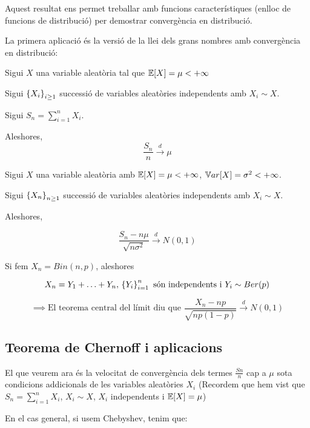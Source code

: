 Aquest resultat ens permet treballar amb funcions característiques (enlloc de funcions de distribució) per
demostrar convergència en distribució.

La primera aplicació és la versió de la llei dels grans nombres amb convergència en distribució:

\begin{thm}
  Sigui $X$ una variable aleatòria tal que $\mathbb{E}[X] = \mu < +\infty$
  
  Sigui $\left\{X_i\right\}_{i\geq1}$ successió de variables aleatòries independents amb $X_i \sim X$.
  
  Sigui $S_n = \sum\limits_{i=1}^n X_i$.
  
  Aleshores,
  \[
    \frac{S_n}{n} \overset{d}{\to} \mu
  \]
\end{thm}

\begin{thm}
  Sigui $X$ una variable aleatòria amb $\mathbb{E}[X] = \mu < +\infty$, $\mathbb{V} ar[X] = \sigma^2 < +\infty$.
  
  Sigui $\left\{X_n\right\}_{n\geq1}$ successió de variables aleatòries independents amb $X_i \sim X$.
  
  Aleshores, 
  
  \[
    \frac{S_n -n\mu}{\sqrt{n\sigma^2}} \overset{d}{\to} N(0,1)
  \]
\end{thm}

\begin{example}
  Si fem $X_n = Bin(n,p)$, aleshores
  
  $$X_n = Y_1 + \ldots + Y_n, \, \left\{Y_i\right\}_{i=1}^n \text{ són independents i } Y_i \sim Ber(p)$$
  
  $$\implies \text{El teorema central del límit diu que } \frac{X_n - np}{\sqrt{np(1-p)}} \overset{d}{\to} N(0,1)$$
\end{example}

\subsection{Teorema de Chernoff i aplicacions}

El que veurem ara és la velocitat de convergència dels termes $\frac{Sn}{n}$ cap a $\mu$ sota condicions 
addicionals de les variables aleatòries $X_i$ (Recordem que hem vist que $S_n = \sum\limits_{i=1}^n X_i$, $X_i\sim X$, $X_i$ 
independents i $\mathbb{E}[X] = \mu$)

En el cas general, si usem Chebyshev, tenim que:

